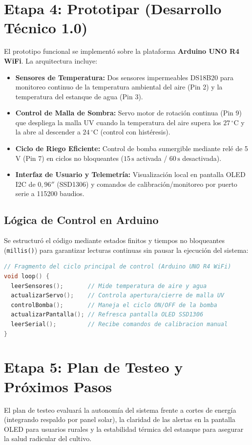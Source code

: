 \documentclass[11pt,a4paper]{article}
\begin{document}
\section{Etapa 4: Prototipar (Desarrollo Técnico 1.0)}
El prototipo funcional se implementó sobre la plataforma \textbf{Arduino UNO R4 WiFi}. La arquitectura incluye:
\begin{itemize}
  \item \textbf{Sensores de Temperatura:} Dos sensores impermeables DS18B20 para monitoreo continuo de la temperatura ambiental del aire (Pin 2) y la temperatura del estanque de agua (Pin 3).
  \item \textbf{Control de Malla de Sombra:} Servo motor de rotación continua (Pin 9) que despliega la malla UV cuando la temperatura del aire supera los $27\,^\circ\mathrm{C}$ y la abre al descender a $24\,^\circ\mathrm{C}$ (control con histéresis).
  \item \textbf{Ciclo de Riego Eficiente:} Control de bomba sumergible mediante relé de 5\,V (Pin 7) en ciclos no bloqueantes ($15\,\mathrm{s}$ activada / $60\,\mathrm{s}$ desactivada).
  \item \textbf{Interfaz de Usuario y Telemetría:} Visualización local en pantalla OLED I2C de $0{,}96''$ (SSD1306) y comandos de calibración/monitoreo por puerto serie a 115200 baudios.
\end{itemize}

\subsection{Lógica de Control en Arduino}
Se estructuró el código mediante estados finitos y tiempos no bloqueantes (\texttt{millis()}) para garantizar lecturas continuas sin pausar la ejecución del sistema:

\begin{lstlisting}[language=C++]
// Fragmento del ciclo principal de control (Arduino UNO R4 WiFi)
void loop() {
  leerSensores();       // Mide temperatura de aire y agua
  actualizarServo();    // Controla apertura/cierre de malla UV
  controlBomba();       // Maneja el ciclo ON/OFF de la bomba
  actualizarPantalla(); // Refresca pantalla OLED SSD1306
  leerSerial();         // Recibe comandos de calibracion manual
}
\end{lstlisting}

\section{Etapa 5: Plan de Testeo y Próximos Pasos}
El plan de testeo evaluará la autonomía del sistema frente a cortes de energía (integrando respaldo por panel solar), la claridad de las alertas en la pantalla OLED para usuarios rurales y la estabilidad térmica del estanque para asegurar la salud radicular del cultivo.
\end{document}
